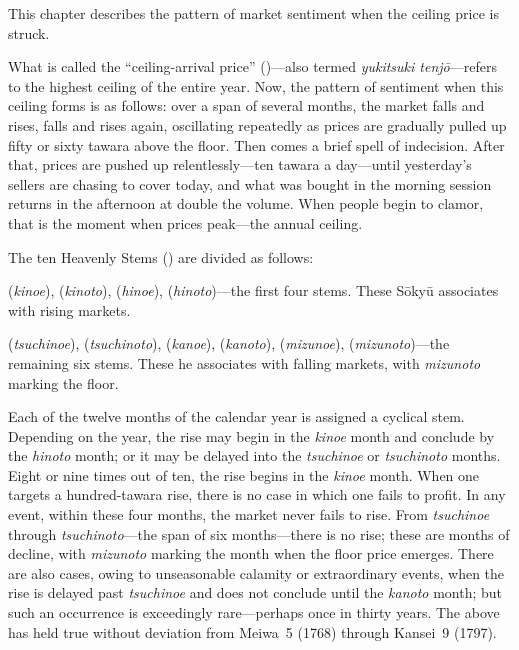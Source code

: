 \commentary
This chapter describes the pattern of market sentiment when the ceiling
price is struck.

What is called the ``ceiling-arrival price'' ()---also
termed \textit{yukitsuki tenj\=o}---refers to the highest ceiling of the
entire year. Now, the pattern of sentiment when this ceiling forms is as
follows: over a span of several months, the market falls and rises, falls
and rises again, oscillating repeatedly as prices are gradually pulled up
fifty or sixty tawara above the floor. Then comes a brief spell of
indecision. After that, prices are pushed up relentlessly---ten tawara a
day---until yesterday's sellers are chasing to cover today, and what was
bought in the morning session returns in the afternoon at double the
volume. When people begin to clamor, that is the moment when prices
peak---the annual ceiling.


\begin{sokyubox}
{\small\itshape\color{sokyubar} }

\medskip
The ten Heavenly Stems () are divided as follows:

\textbf{} (\textit{kinoe}), \textbf{} (\textit{kinoto}),
\textbf{} (\textit{hinoe}), \textbf{}
(\textit{hinoto})---the first four stems. These S\=oky\=u associates
with rising markets.

\textbf{} (\textit{tsuchinoe}), \textbf{}
(\textit{tsuchinoto}), \textbf{} (\textit{kanoe}),
\textbf{} (\textit{kanoto}), \textbf{}
(\textit{mizunoe}), \textbf{}
(\textit{mizunoto})---the remaining six stems. These he associates with
falling markets, with \textit{mizunoto} marking the floor.

Each of the twelve months of the calendar year is assigned a cyclical
stem. Depending on the year, the rise may begin in the \textit{kinoe}
month and conclude by the \textit{hinoto} month; or it may be delayed
into the \textit{tsuchinoe} or \textit{tsuchinoto} months. Eight or nine
times out of ten, the rise begins in the \textit{kinoe} month. When one
targets a hundred-tawara rise, there is no case in which one fails to
profit. In any event, within these four months, the market never fails
to rise. From \textit{tsuchinoe} through
\textit{tsuchinoto}---the
span of six months---there is no rise; these are months of decline, with
\textit{mizunoto} marking the month when the floor price emerges. There
are also cases, owing to unseasonable calamity or extraordinary events,
when the rise is delayed past \textit{tsuchinoe} and does not conclude
until the \textit{kanoto} month; but such an occurrence is exceedingly
rare---perhaps once in thirty years. The above has held true without
deviation from Meiwa~5 (1768) through Kansei~9 (1797).
\end{sokyubox}

